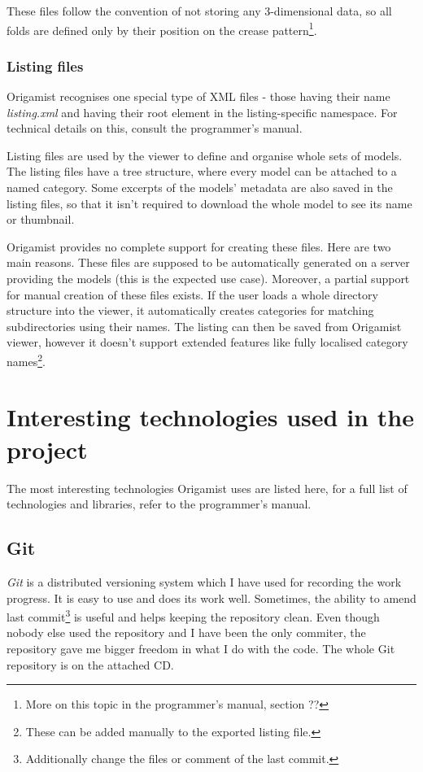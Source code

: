 These files follow the convention of not storing any 3-dimensional data, so all
folds are defined only by their position on the crease pattern\footnote{More on this topic in the programmer's manual, section ??}. %

\subsubsection{Listing files}
Origamist recognises one special type of XML files - those having their name
\emph{listing.xml} and having their root element in the listing-specific namespace. For technical details on this, consult the programmer's manual. %

Listing files are used by the viewer to define and organise whole sets of models. The listing files have a tree structure, where every model can be attached to a named category. Some excerpts of the models' metadata are also saved in the listing files, so that it isn't required to download the whole model to see its name or thumbnail.

Origamist provides no complete support for creating these files. Here are two
main reasons. These files are supposed to be automatically generated on a server
providing the models (this is the expected use case).  Moreover, a partial support for manual creation of these files exists. If the user loads a whole directory structure into the viewer, it automatically creates categories for matching subdirectories using their names. The listing can then be saved from Origamist viewer, however it doesn't support extended features like fully localised category names\footnote{These can be added manually to the exported listing file.}.

\section{Interesting technologies used in the project}
The most interesting technologies Origamist uses are listed here, for a full list of technologies and libraries, refer to the programmer's manual. %
\subsection{Git}
\emph{Git} is a distributed versioning system which I have used for recording the work progress. It is easy to use and does its work well. Sometimes, the ability to amend last commit\footnote{Additionally change the files or comment of the last commit.} is useful and helps keeping the repository clean. Even though nobody else used the repository and I have been the only commiter, the repository gave me bigger freedom in what I do with the code. The whole Git repository is on the attached CD.
